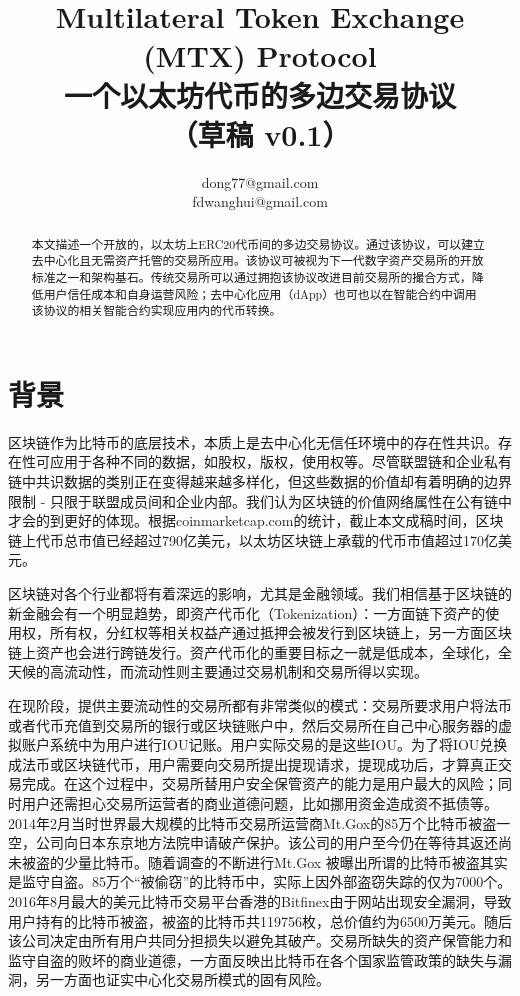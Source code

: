 \documentclass[UTF8,nofonts]{ctexart}
\title{Multilateral Token Exchange (MTX) Protocol\\一个以太坊代币的多边交易协议\\（草稿 v0.1）}
\author{
    dong77@gmail.com\\
    fdwanghui@gmail.com    %
}
\begin{document}
\maketitle

\begin{abstract}
本文描述一个开放的，以太坊上ERC20代币间的多边交易协议。通过该协议，可以建立去中心化且无需资产托管的交易所应用。该协议可被视为下一代数字资产交易所的开放标准之一和架构基石。传统交易所可以通过拥抱该协议改进目前交易所的撮合方式，降低用户信任成本和自身运营风险；去中心化应用（dApp）也可也以在智能合约中调用该协议的相关智能合约实现应用内的代币转换。

\end{abstract}

\newpage

\tableofcontents
\newpage

\section{背景\label{sec:background}}

区块链作为比特币的底层技术，本质上是去中心化无信任环境中的存在性共识。存在性可应用于各种不同的数据，如股权，版权，使用权等。尽管联盟链和企业私有链中共识数据的类别正在变得越来越多样化，但这些数据的价值却有着明确的边界限制 - 只限于联盟成员间和企业内部。我们认为区块链的价值网络属性在公有链中才会的到更好的体现。根据coinmarketcap.com的统计，截止本文成稿时间，区块链上代币总市值已经超过790亿美元，以太坊区块链上承载的代币市值超过170亿美元。

区块链对各个行业都将有着深远的影响，尤其是金融领域。我们相信基于区块链的新金融会有一个明显趋势，即资产代币化（Tokenization）：一方面链下资产的使用权，所有权，分红权等相关权益产通过抵押会被发行到区块链上，另一方面区块链上资产也会进行跨链发行。资产代币化的重要目标之一就是低成本，全球化，全天候的高流动性，而流动性则主要通过交易机制和交易所得以实现。

在现阶段，提供主要流动性的交易所都有非常类似的模式：交易所要求用户将法币或者代币充值到交易所的银行或区块链账户中，然后交易所在自己中心服务器的虚拟账户系统中为用户进行IOU记账。用户实际交易的是这些IOU。为了将IOU兑换成法币或区块链代币，用户需要向交易所提出提现请求，提现成功后，才算真正交易完成。在这个过程中，交易所替用户安全保管资产的能力是用户最大的风险；同时用户还需担心交易所运营者的商业道德问题，比如挪用资金造成资不抵债等。2014年2月当时世界最大规模的比特币交易所运营商Mt.Gox的85万个比特币被盗一空，公司向日本东京地方法院申请破产保护。该公司的用户至今仍在等待其返还尚未被盗的少量比特币。随着调查的不断进行Mt.Gox 被曝出所谓的比特币被盗其实是监守自盗。85万个“被偷窃”的比特币中，实际上因外部盗窃失踪的仅为7000个。2016年8月最大的美元比特币交易平台香港的Bitfinex由于网站出现安全漏洞，导致用户持有的比特币被盗，被盗的比特币共119756枚，总价值约为6500万美元。随后该公司决定由所有用户共同分担损失以避免其破产。交易所缺失的资产保管能力和监守自盗的败坏的商业道德，一方面反映出比特币在各个国家监管政策的缺失与漏洞，另一方面也证实中心化交易所模式的固有风险。
\end{document}
